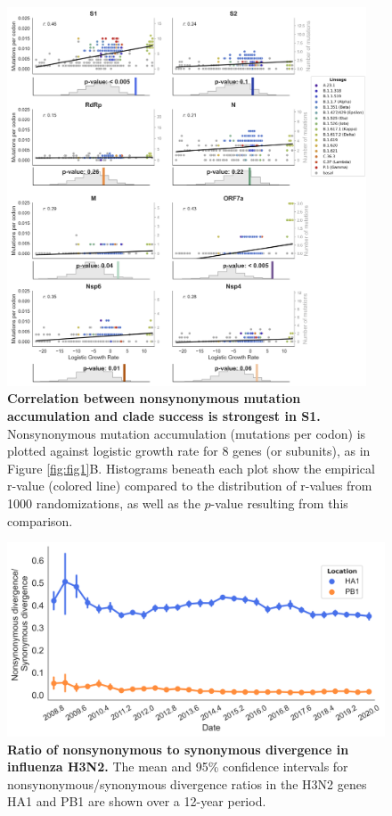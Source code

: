 \documentclass[11pt,oneside,letterpaper]{article}
\begin{document}
\begin{figure}[h!]
	\centerline{\includegraphics[width=0.95\textwidth]{fig1_supp3.png}}
	\caption{\textbf{Correlation between nonsynonymous mutation accumulation and clade success is strongest in S1.}
	Nonsynonymous mutation accumulation (mutations per codon) is plotted against logistic growth rate for 8 genes (or subunits), as in Figure \ref{fig:fig1}B. Histograms beneath each plot show the empirical r-value (colored line) compared to the distribution of r-values from 1000 randomizations, as well as the $p$-value resulting from this comparison.
	}
	\label{fig:fig1_supp3}
\end{figure}

\begin{figure}[h!]
	\centerline{\includegraphics[scale=0.55]{fig2_supp.png}}
	\caption{\textbf{Ratio of nonsynonymous to synonymous divergence in influenza H3N2.}
	The mean and 95\% confidence intervals for nonsynonymous/synonymous divergence ratios in the H3N2 genes HA1 and PB1 are shown over a 12-year period.
	}
	\label{fig:fig2_supp1}
\end{figure}
\end{document}
